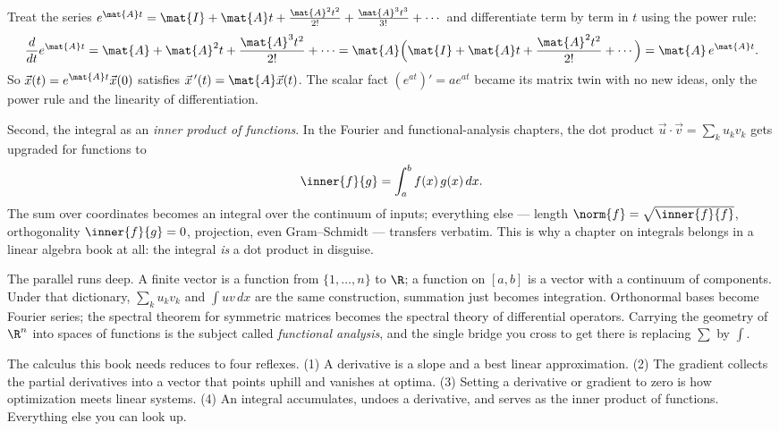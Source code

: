 \begin{example}
\label{ch39:ex-matexp}
Treat the series $e^{\mat{A}t} = \mat{I} + \mat{A}t + \frac{\mat{A}^2 t^2}{2!} + \frac{\mat{A}^3
t^3}{3!} + \cdots$ and differentiate term by term in $t$ using the power rule:
\[
\frac{d}{dt}e^{\mat{A}t} = \mat{A} + \mat{A}^2 t + \frac{\mat{A}^3 t^2}{2!} + \cdots
= \mat{A}\Bigl(\mat{I} + \mat{A}t + \frac{\mat{A}^2 t^2}{2!} + \cdots\Bigr) = \mat{A}\,e^{\mat{A}t}.
\]
So $\vec{x}(t) = e^{\mat{A}t}\vec{x}(0)$ satisfies $\vec{x}\,'(t) = \mat{A}\vec{x}(t)$. The scalar
fact $(e^{at})' = a e^{at}$ became its matrix twin with no new ideas, only the power rule and the
linearity of differentiation.
\end{example}

Second, the integral as an \emph{inner product of functions}. In the Fourier and functional-analysis
chapters, the dot product $\vec{u}\cdot\vec{v} = \sum_k u_k v_k$ gets upgraded for functions to
\[
\inner{f}{g} = \int_a^b f(x)\,g(x)\,dx.
\]
The sum over coordinates becomes an integral over the continuum of inputs; everything else --- length
$\norm{f} = \sqrt{\inner{f}{f}}$, orthogonality $\inner{f}{g} = 0$, projection, even Gram--Schmidt
--- transfers verbatim. This is why a chapter on integrals belongs in a linear algebra book at all:
the integral \emph{is} a dot product in disguise.

\begin{connectionbox}
The parallel runs deep. A finite vector is a function from $\{1,\dots,n\}$ to $\R$; a function on
$[a,b]$ is a vector with a continuum of components. Under that dictionary, $\sum_k u_k v_k$ and
$\int u v\,dx$ are the same construction, summation just becomes integration. Orthonormal bases
become Fourier series; the spectral theorem for symmetric matrices becomes the spectral theory of
differential operators. Carrying the geometry of $\R^n$ into spaces of functions is the subject
called \emph{functional analysis}, and the single bridge you cross to get there is replacing $\sum$
by $\int$.
\end{connectionbox}

\begin{focusbox}
The calculus this book needs reduces to four reflexes. (1) A derivative is a slope and a best linear
approximation. (2) The gradient collects the partial derivatives into a vector that points uphill and
vanishes at optima. (3) Setting a derivative or gradient to zero is how optimization meets linear
systems. (4) An integral accumulates, undoes a derivative, and serves as the inner product of
functions. Everything else you can look up.
\end{focusbox}

